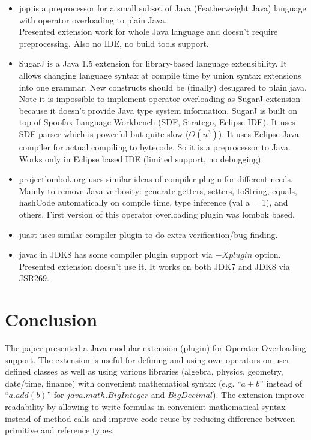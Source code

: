 \documentclass{aircc}
\begin{document}
\begin{itemize}
\item jop\cite{jop}
is a preprocessor for a small subset of Java (Featherweight Java) language with operator overloading to plain Java. \\
Presented extension work for whole Java language and doesn't require preprocessing.
Also no IDE, no build tools support.
\item SugarJ\cite{sugarj}
is a Java 1.5 extension for library-based language extensibility. 
It allows changing language syntax at compile time by union syntax extensions into one grammar.
New constructs should be (finally) desugared to plain java.
Note it is impossible to implement operator overloading as SugarJ extension because it doesn't provide Java type system information.
SugarJ is built on top of Spoofax Language Workbench (SDF, Stratego, Eclipse IDE).
It uses SDF parser which is powerful but quite slow ($O(n^3)$).
It uses Eclipse Java compiler for actual compiling to bytecode. So it is a preprocessor to Java.
Works only in Eclipse based IDE (limited support, no debugging).
\item projectlombok.org uses similar ideas of compiler plugin for different needs. 
Mainly to remove Java verbosity:
generate getters, setters, toString, equals, hashCode automatically on compile time, 
type inference (val a = 1), and others.
First version of this operator overloading plugin was lombok based\cite{lombok-oo}.
\item juast\cite{juast} uses similar compiler plugin to do extra verification/bug finding.
\item javac in JDK8 has some compiler plugin support via $-Xplugin$ option\cite{Xplugin}.
Presented extension doesn't use it. It works on both JDK7 and JDK8 via JSR269.
\end{itemize}

\section{Conclusion}
The paper presented a Java modular extension (plugin) for
Operator Overloading support. 
The extension is useful for
 defining and using own operators on user defined classes
 as well as using various libraries (algebra, physics, geometry, date/time, finance) 
  with convenient mathematical syntax
  (e.g. ``$a + b$'' instead of ``$a.add(b)$'' for $java.math.BigInteger$ and $BigDecimal$).
The extension improve readability by allowing to write formulas in convenient mathematical syntax
instead of method calls and improve code reuse by reducing difference between primitive and reference types.
\end{document}
